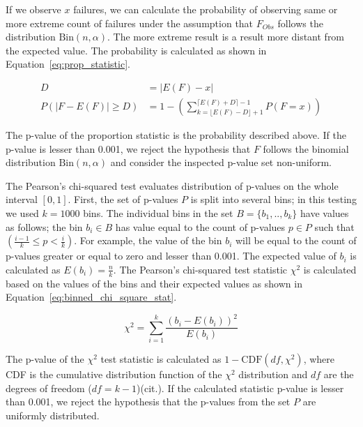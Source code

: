 \documentclass[
  digital,  	%
  color,		%
  oneside,   	%
  12pt,
  nocover,
  notable,
  nolof,
  nolot,
]{fithesis3}
\theoremstyle{definition}
\theoremstyle{remark}
\begin{document}
If we observe $x$ failures, we can calculate the probability of observing same or more extreme count of failures under the assumption that $F_{Obs}$ follows the distribution $\text{Bin}(n,\alpha)$. The more extreme result is a result more distant from the expected value. The probability is calculated as shown in Equation~\ref{eq:prop_statistic}.

\begin{align}
D &= \lvert E(F) - x \rvert \\
\label{eq:prop_statistic}
P(\lvert F - E(F) \rvert \geq D) &= 1 - \left( \sum\limits_{k=\lfloor E(F)-D \rfloor + 1}^{\lceil E(F)+D \rceil - 1} P(F = x) \right)
\end{align}

The p-value of the proportion statistic is the probability described above. If the p-value is lesser than 0.001, we reject the hypothesis that $F$ follows the binomial distribution $\text{Bin}(n,\alpha)$ and consider the inspected p-value set non-uniform.

The Pearson's chi-squared test evaluates distribution of p-values on the whole interval $[0,1]$. First, the set of p-values $P$ is split into several bins; in this testing we used $k=1000$ bins. The individual bins in the set $B = \{b_1,..,b_k\}$ have values as follows; the bin $b_i \in B$ has value equal to the count of p-values $p \in P$ such that $\left(\frac{i-1}{k} \leq p < \frac{i}{k}\right)$. For example, the value of the bin $b_i$ will be equal to the count of p-values greater or equal to zero and lesser than 0.001. The expected value of $b_i$ is calculated as $E(b_i) = \frac{n}{k}$. The Pearson's chi-squared test statistic $\chi^2$ is calculated based on the values of the bins and their expected values as shown in Equation~\ref{eq:binned_chi_square_stat}.

\begin{equation}
\label{eq:binned_chi_square_stat}
\chi^2 = \sum\limits_{i=1}^{k} \frac{ \left( b_i - E(b_i) \right)^{2} }{E(b_i)}
\end{equation}

The p-value of the $\chi^2$ test statistic is calculated as $1-\text{CDF}(df, \chi^2)$, where CDF is the cumulative distribution function of the $\chi^2$ distribution and $df$ are the degrees of freedom ($df=k-1$)(cit.). If the calculated statistic p-value is lesser than 0.001, we reject the hypothesis that the p-values from the set $P$ are uniformly distributed.
\end{document}
